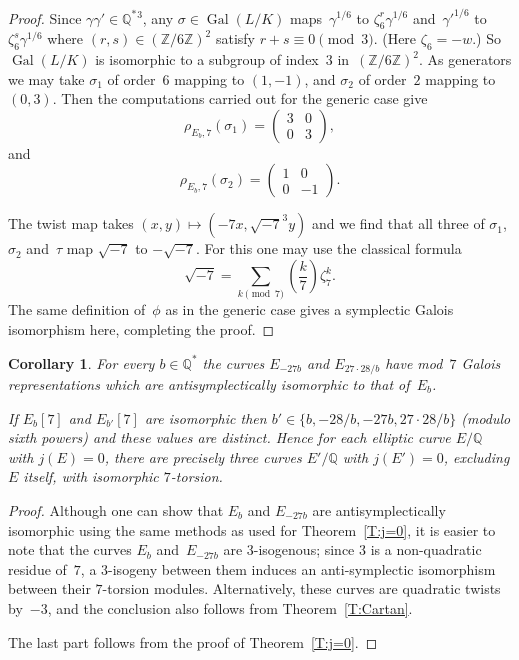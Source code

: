\documentclass[12pt, reqno]{amsart}
\newcommand{\Q}{\mathbb{Q}}
\newcommand{\Z}{\mathbb{Z}}
\DeclareMathOperator{\Gal}{Gal}
\def\legendre#1#2{\left(\displaystyle\frac{#1}{#2}\right)}
\numberwithin{equation}{section}
\newtheorem{corollary}[theorem]{Corollary}
\theoremstyle{definition}
\theoremstyle{remark}
\begin{document}
\begin{proof}
Since $\gamma\gamma'\in\Q^*{}^3$, any $\sigma\in\Gal(L/K)$
maps~$\gamma^{1/6}$ to $\zeta_6^r\gamma^{1/6}$ and~$\gamma'^{1/6}$ to
$\zeta_6^s\gamma^{1/6}$ where $(r,s)\in(\Z/6\Z)^2$ satisfy
$r+s\equiv0\pmod3$.  (Here $\zeta_6=-w$.) So $\Gal(L/K)$ is isomorphic
to a subgroup of index~$3$ in~$(\Z/6\Z)^2$.  As generators we may take
$\sigma_1$ of order~$6$ mapping to $(1,-1)$, and $\sigma_2$ of
order~$2$ mapping to $(0,3)$.  Then the computations carried out for
the generic case give
\[
   \rho_{E_b,7}(\sigma_1) = \begin{pmatrix}3&0\\0&3   \end{pmatrix},
\]
and
\[
   \rho_{E_b,7}(\sigma_2) = \begin{pmatrix}1&0\\0&-1   \end{pmatrix}.
\]

The twist map takes $(x,y)\mapsto(-7x,\sqrt{-7}^3y)$ and we find that
all three of $\sigma_1$, $\sigma_2$ and~$\tau$ map $\sqrt{-7}$ to
$-\sqrt{-7}$.  For this one may use the classical formula
\[
   \sqrt{-7} = \sum_{k\pmod7}\legendre{k}{7}\zeta_7^k.
\]
The same definition of~$\phi$ as in the generic case gives a
symplectic Galois isomorphism here, completing the proof.
\end{proof}

\begin{corollary}
For every $b\in\Q^*$ the curves $E_{-27b}$ and $E_{27\cdot28/b}$ have
mod~$7$ Galois representations which are antisymplectically isomorphic
to that of~$E_b$.

If $E_b[7]$ and $E_{b'}[7]$ are isomorphic then $b'\in\{b,-28/b, -27b,
27\cdot28/b\}$ (modulo sixth powers) and these values are distinct.
Hence for each elliptic curve $E/\Q$ with $j(E)=0$, there are
precisely three curves $E'/\Q$ with $j(E')=0$, excluding $E$ itself,
with isomorphic $7$-torsion.
\end{corollary}
\begin{proof}
Although one can show that $E_b$ and $E_{-27b}$ are antisymplectically
isomorphic using the same methods as used for Theorem~\ref{T:j=0}, it
is easier to note that the curves $E_b$ and~$E_{-27b}$ are
$3$-isogenous; since $3$ is a non-quadratic residue of~$7$, a
$3$-isogeny between them induces an anti-symplectic isomorphism
between their $7$-torsion modules. Alternatively, these curves are
quadratic twists by~$-3$, and the conclusion also follows from
Theorem~\ref{T:Cartan}.

The last part follows from the proof of Theorem~\ref{T:j=0}.
\end{proof}
\end{document}
